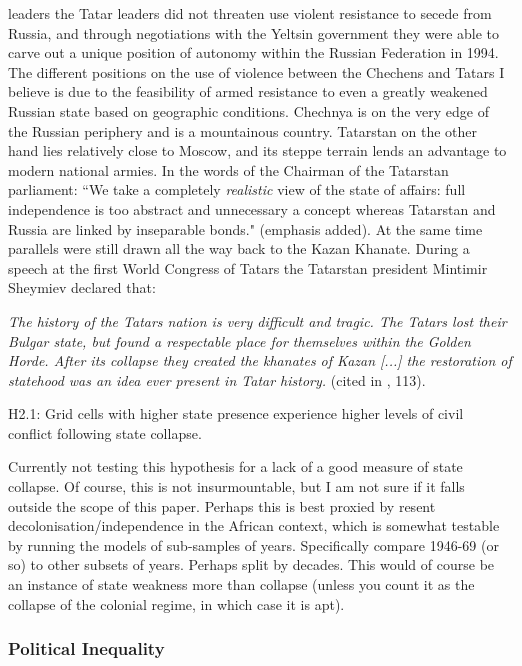 \documentclass[12pt]{article}
\begin{document}
leaders the Tatar leaders did not threaten use violent resistance to secede from
Russia, and through negotiations with the Yeltsin government they were able to
carve out a unique position of autonomy within the Russian Federation in 1994.
The different positions on the use of violence between the Chechens and Tatars
I believe is due to the feasibility of armed resistance to even a greatly
weakened Russian state based on geographic conditions. Chechnya is on the very
edge of the Russian periphery and is a mountainous country. Tatarstan on the
other hand lies relatively close to Moscow, and its steppe terrain lends an
advantage to modern national armies. In the words of the Chairman of the
Tatarstan parliament: ``We take a completely \textit{realistic} view of the
state of affairs: full independence is too abstract and unnecessary a concept
whereas Tatarstan and Russia are linked by inseparable bonds."
\citep{Sharifzhanov_2007}(emphasis added). At the same time parallels were still
drawn all the way back to the Kazan Khanate. During a speech at the first World
Congress of Tatars the Tatarstan president Mintimir Sheymiev declared that:

\textit{The history of the Tatars nation is very difficult and tragic. The
Tatars lost their Bulgar state, but found a respectable place for themselves
within the Golden Horde. After its collapse they created the khanates of Kazan
[...] the restoration of statehood was an idea ever present in Tatar history.}
(cited in \citet{mustafin1995pervyi}, 113).

H2.1: Grid cells with higher state presence experience higher levels of civil
conflict following state collapse. 

Currently not testing this hypothesis for a lack of a good measure of state
collapse. Of course, this is not insurmountable, but I am not sure if it
falls outside the scope of this paper. Perhaps this is best proxied by resent
decolonisation/independence in the African context, which is somewhat testable
by running the models of sub-samples of years. Specifically compare 1946-69 (or
so) to other subsets of years. Perhaps split by decades. This would of course
be an instance of state weakness more than collapse (unless you count it as the
collapse of the colonial regime, in which case it is apt).

\subsubsection{Political Inequality}
\end{document}
